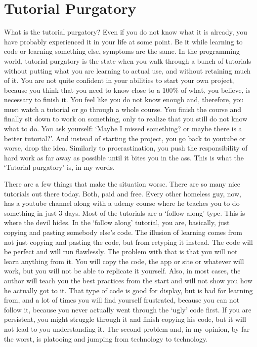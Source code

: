 \documentclass[]{book}
\begin{document}
\hypertarget{tutorial-purgatory}{%
\section{Tutorial Purgatory}\label{tutorial-purgatory}}

What is the tutorial purgatory? Even if you do not know what it is already, you have probably experienced it in your life at some point. Be it while learning to code or learning something else, symptoms are the same. In the programming world, tutorial purgatory is the state when you walk through a bunch of tutorials without putting what you are learning to actual use, and without retaining much of it. You are not quite confident in your abilities to start your own project, because you think that you need to know close to a 100\% of what, you believe, is necessary to finish it. You feel like you do not know enough and, therefore, you must watch a tutorial or go through a whole course. You finish the course and finally sit down to work on something, only to realize that you still do not know what to do. You ask yourself: `Maybe I missed something? or maybe there is a better tutorial?'. And instead of starting the project, you go back to youtube or worse, drop the idea. Similarly to procrastination, you push the responsibility of hard work as far away as possible until it bites you in the ass. This is what the `Tutorial purgatory' is, in my words.

There are a few things that make the situation worse. There are so many nice tutorials out there today. Both, paid and free. Every other homeless guy, now, has a youtube channel along with a udemy course where he teaches you to do something in just 3 days. Most of the tutorials are a `follow along' type. This is where the devil hides. In the `follow along' tutorial, you are, basically, just copying and pasting somebody else's code. The illusion of learning comes from not just copying and pasting the code, but from retyping it instead. The code will be perfect and will run flawlessly. The problem with that is that you will not learn anything from it. You will copy the code, the app or site or whatever will work, but you will not be able to replicate it yourself. Also, in most cases, the author will teach you the best practices from the start and will not show you how he actually got to it. That type of code is good for display, but is bad for learning from, and a lot of times you will find yourself frustrated, because you can not follow it, because you never actually went through the `ugly' code first. If you are persistent, you might struggle through it and finish copying his code, but it will not lead to you understanding it. The second problem and, in my opinion, by far the worst, is platooing and jumping from technology to technology.
\end{document}
